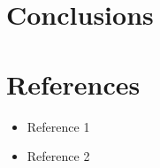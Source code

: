 \documentclass{report}
\begin{document}
\chapter{Conclusions}

\newpage
{}
\chapter*{References}
\begin{itemize}
    \item Reference 1
    \item Reference 2
\end{itemize}

\newpage
{}
\listoffigures
\end{document}

